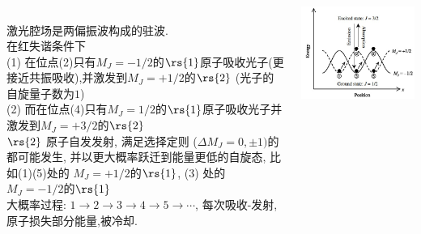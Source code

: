     \begin{frame} 
    \frametitle{}
    \begin{columns}
    \begin{column}[t]{0.65\linewidth}
    ~\\
    激光腔场是两偏振波构成的驻波. \\ {\vspace*{0.3em}}
    {\Bullet}在红失谐条件下\\ 
    (1) 在位点(2)只有$M_J=-1/2$的$\rs{1}$原子吸收光子(更接近共振吸收),并激发到$M_J=+1/2$的$\rs{2}$ (光子的自旋量子数为$1$)  \\ 
    (2) 而在位点(4)只有$M_J=1/2$的$\rs{1}$原子吸收光子并激发到$M_J=+3/2$的$\rs{2}$   \\ {\vspace*{0.3em}}
    {\Bullet} $\rs{2}$ 原子自发发射, 满足选择定则 ($\Delta M_J = 0, \pm 1)$的都可能发生, 并以更大概率跃迁到能量更低的自旋态, 比如(1)(5)处的 $M_J=+1/2$的$\rs{1}$, (3) 处的 $M_J=-1/2$的$\rs{1}$ \\ {\vspace*{0.3em}}
    {\Bullet} 大概率过程: $1\to2\to3\to4\to5\to \cdots$,  每次吸收-发射, 原子损失部分能量,被冷却.
    \end{column}
    \begin{column}[t]{0.35\linewidth} 
        \begin{center}
            \includegraphics[width=1.0\textwidth]{figs/2022-05-30-14-49-27.png}
        \end{center}
    \end{column}
    \end{columns}
    \end{frame}

